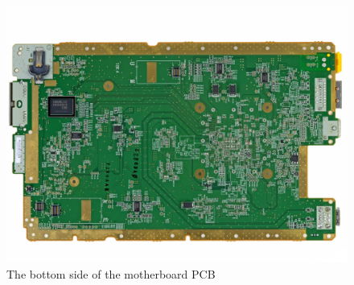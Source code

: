\documentclass[11pt,a4paper,titlepage]{article}
\begin{document}
        \begin{figure}
          \centering
          \includegraphics[width = .8\textwidth]{motherboard_back.png}
          \caption{The bottom side of the motherboard PCB}
          \label{fig:motherboard_bottom}
        \end{figure}



\end{document}

